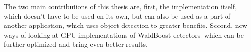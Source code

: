 The two main contributions of this thesis are, first, the implementation itself, which doesn't have to be used on its own, but can also be used as a part of another application, which uses object detection to greater benefits. Second, new ways of looking at GPU implementations of WaldBoost detectors, which can be further optimized and bring even better results.



\nocite{wong2010}
\nocite{sochman2004}
\nocite{freund1997}
\nocite{lindholm2008nvidia}
\nocite{owens2007survey}	
\nocite{zemcik2013high}
\nocite{warps-occupancy}
\nocite{memory-coalescing}
\nocite{gpu-opt-fundamentals}